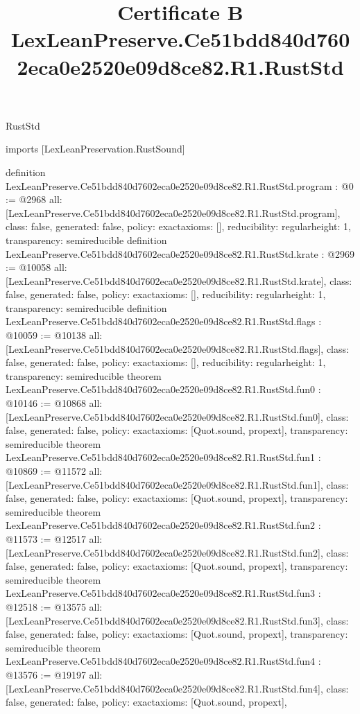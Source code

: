 \begin{lexlean}{RustStd}
\title{Certificate B LexLeanPreserve.Ce51bdd840d7602eca0e2520e09d8ce82.R1.RustStd}
\begin{coremodule}
imports [LexLeanPreservation.RustSound]

definition LexLeanPreserve.Ce51bdd840d7602eca0e2520e09d8ce82.R1.RustStd.program : @0 := @2968 {
  all: [LexLeanPreserve.Ce51bdd840d7602eca0e2520e09d8ce82.R1.RustStd.program],
  class: false,
  generated: false,
  policy: exact{axioms: []},
  reducibility: regular{height: 1},
  transparency: semireducible
}
definition LexLeanPreserve.Ce51bdd840d7602eca0e2520e09d8ce82.R1.RustStd.krate : @2969 := @10058 {
  all: [LexLeanPreserve.Ce51bdd840d7602eca0e2520e09d8ce82.R1.RustStd.krate],
  class: false,
  generated: false,
  policy: exact{axioms: []},
  reducibility: regular{height: 1},
  transparency: semireducible
}
definition LexLeanPreserve.Ce51bdd840d7602eca0e2520e09d8ce82.R1.RustStd.flags : @10059 := @10138 {
  all: [LexLeanPreserve.Ce51bdd840d7602eca0e2520e09d8ce82.R1.RustStd.flags],
  class: false,
  generated: false,
  policy: exact{axioms: []},
  reducibility: regular{height: 1},
  transparency: semireducible
}
theorem LexLeanPreserve.Ce51bdd840d7602eca0e2520e09d8ce82.R1.RustStd.fun0 : @10146 := @10868 {
  all: [LexLeanPreserve.Ce51bdd840d7602eca0e2520e09d8ce82.R1.RustStd.fun0],
  class: false,
  generated: false,
  policy: exact{axioms: [Quot.sound, propext]},
  transparency: semireducible
}
theorem LexLeanPreserve.Ce51bdd840d7602eca0e2520e09d8ce82.R1.RustStd.fun1 : @10869 := @11572 {
  all: [LexLeanPreserve.Ce51bdd840d7602eca0e2520e09d8ce82.R1.RustStd.fun1],
  class: false,
  generated: false,
  policy: exact{axioms: [Quot.sound, propext]},
  transparency: semireducible
}
theorem LexLeanPreserve.Ce51bdd840d7602eca0e2520e09d8ce82.R1.RustStd.fun2 : @11573 := @12517 {
  all: [LexLeanPreserve.Ce51bdd840d7602eca0e2520e09d8ce82.R1.RustStd.fun2],
  class: false,
  generated: false,
  policy: exact{axioms: [Quot.sound, propext]},
  transparency: semireducible
}
theorem LexLeanPreserve.Ce51bdd840d7602eca0e2520e09d8ce82.R1.RustStd.fun3 : @12518 := @13575 {
  all: [LexLeanPreserve.Ce51bdd840d7602eca0e2520e09d8ce82.R1.RustStd.fun3],
  class: false,
  generated: false,
  policy: exact{axioms: [Quot.sound, propext]},
  transparency: semireducible
}
theorem LexLeanPreserve.Ce51bdd840d7602eca0e2520e09d8ce82.R1.RustStd.fun4 : @13576 := @19197 {
  all: [LexLeanPreserve.Ce51bdd840d7602eca0e2520e09d8ce82.R1.RustStd.fun4],
  class: false,
  generated: false,
  policy: exact{axioms: [Quot.sound, propext]},
}
\end{coremodule}
\end{lexlean}
